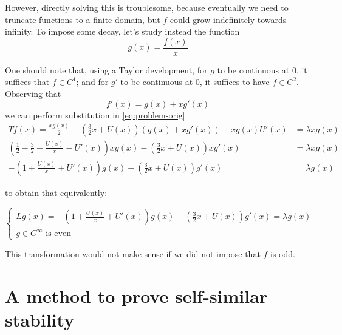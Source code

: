 \documentclass[11pt,a4paper]{article}
\begin{document}
However, directly solving this is troublesome, because eventually we need to truncate functions to a finite domain, but $f$ could grow indefinitely towards infinity. To impose some decay, let's study instead the function $$g(x) = \frac{f(x)}{x}$$ 

One should note that, using a Taylor development, for $g$ to be continuous at $0$, it suffices that $f \in C^1$; and for $g'$ to be continuous at 0, it suffices to have $f\in C^2$. Observing that $$f'(x) = g(x) + xg'(x)$$ we can perform substitution in \ref{eq:problem-orig} 
\begin{align*}
    Tf(x) = \frac{xg(x)}{2} -\left(\frac{3}{2}x + U(x)\right)(g(x)+xg'(x)) - xg(x)U'(x) &= \lambda xg(x) \\
    \left(\frac{1}{2} - \frac{3}{2} - \frac{U(x)}{x} - U'(x)\right) xg(x) - \left(\frac{3}{2}x + U(x)\right)xg'(x) &= \lambda xg(x) \\
    -\left(1 + \frac{U(x)}{x} + U'(x)\right) g(x) - \left(\frac{3}{2}x + U(x)\right)g'(x) &= \lambda g(x)
\end{align*}

to obtain that equivalently:

\begin{equation}\label{eq:problem-new}
    \begin{cases}
        Lg(x) = -\left(1+\frac{U(x)}{x} + U'(x)\right)g(x) - \left(\frac{3}{2}x + U(x)\right)g'(x) = \lambda g(x) \\
        g \in C^\infty \text{ is even}
    \end{cases}
\end{equation}

This transformation would not make sense if we did not impose that $f$ is odd.

\section{A method to prove self-similar stability}
\end{document}
